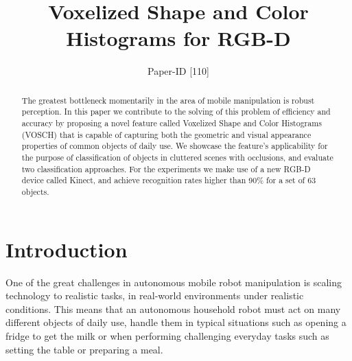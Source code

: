 \documentclass[conference]{sty/IEEEtran}
\begin{document}
\title{Voxelized Shape and Color Histograms for RGB-D}

\author{Paper-ID [110]}


\newcommand{\todo}[1]{\textbf{\textcolor{red}{TODO: #1}}}
\maketitle

\begin{abstract}
The greatest bottleneck momentarily in the area of mobile manipulation is robust perception.
In this paper we contribute to the solving of this problem of efficiency and accuracy
by proposing a novel feature called Voxelized Shape and Color Histograms 
(VOSCH) that is capable of capturing both the geometric and visual appearance
properties of common objects of daily use. We showcase the
feature's applicability for the purpose of classification of objects in cluttered scenes with occlusions,
and evaluate two classification approaches.
For the experiments we make use of a new RGB-D device called Kinect, and achieve recognition
rates higher than 90\% for a set of 63 objects.
\end{abstract}

\IEEEpeerreviewmaketitle

\section{Introduction}
One of the great challenges in autonomous mobile robot manipulation is scaling
technology to realistic tasks, in real-world environments under realistic
conditions. This means that an autonomous household robot must act on many
different objects of daily use, handle them in typical situations such as
opening a fridge to get the milk or when performing challenging everyday tasks
such as setting the table or preparing a meal.
\end{document}
